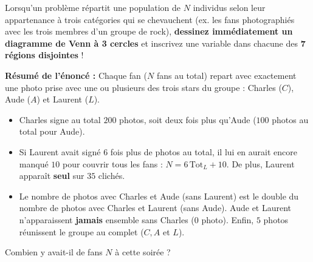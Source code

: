 Lorsqu'un problème répartit une population de $N$ individus selon leur appartenance à trois catégories qui se chevauchent (ex. les fans photographiés avec les trois membres d'un groupe de rock), \textbf{dessinez immédiatement un diagramme de Venn à 3 cercles} et inscrivez une variable dans chacune des \textbf{7 régions disjointes} !

\begin{exemple}
\textbf{Résumé de l'énoncé :} Chaque fan ($N$ fans au total) repart avec exactement une photo prise avec une ou plusieurs des trois stars du groupe : Charles ($C$), Aude ($A$) et Laurent ($L$).
\begin{itemize}
    \item Charles signe au total $200$ photos, soit deux fois plus qu'Aude ($100$ photos au total pour Aude).
    \item Si Laurent avait signé $6$ fois plus de photos au total, il lui en aurait encore manqué $10$ pour couvrir tous les fans : $N = 6\,\text{Tot}_L + 10$. De plus, Laurent apparaît \textbf{seul} sur $35$ clichés.
    \item Le nombre de photos avec Charles et Aude (sans Laurent) est le double du nombre de photos avec Charles et Laurent (sans Aude). Aude et Laurent n'apparaissent \textbf{jamais} ensemble sans Charles ($0$ photo). Enfin, $5$ photos réunissent le groupe au complet ($C, A$ et $L$).
\end{itemize}
Combien y avait-il de fans $N$ à cette soirée ?

\begin{center}
\end{center}


\end{exemple}
